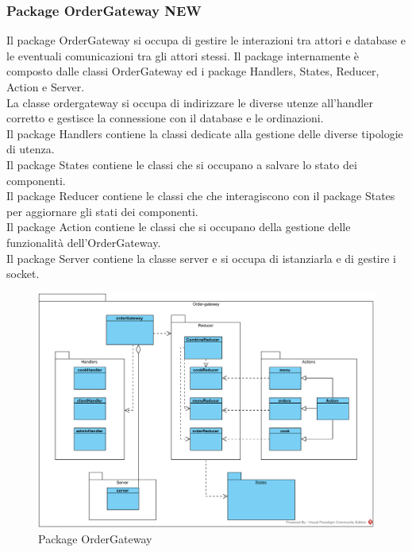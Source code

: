 \subsubsection{Package Order\-Gateway NEW}
Il package Order\-Gateway si occupa di gestire le interazioni tra attori e database e le eventuali comunicazioni tra gli attori stessi. Il package internamente è composto dalle classi Order\-Gateway ed i package Handlers, States, Reducer, Action e Server.\\
La classe order\-gateway si occupa di indirizzare le diverse utenze all'handler corretto e gestisce la connessione con il database e le ordinazioni.\\
Il package Handlers contiene la classi dedicate alla gestione delle diverse tipologie di utenza.\\
Il package States contiene le classi che si occupano a salvare lo stato dei componenti.\\
Il package Reducer contiene le classi che che interagiscono con il package States per aggiornare gli stati dei componenti.\\
Il package Action contiene le classi che si occupano della gestione delle funzionalità dell'Order\-Gateway.\\
Il package Server contiene la classe server e si occupa di istanziarla e di gestire i socket.\\
\begin{figure}[H]
	\centering
	\includegraphics[width=14cm]{diagrammi_img/classi_e_package/ordergateNEW.png}
	\caption{Package Order\-Gateway}
\end{figure}

